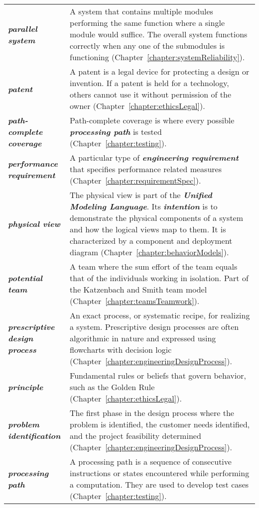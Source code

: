 \begin{longtable} { p{4cm} p{11cm}}
\emph{\textbf{parallel system}} & A system that contains multiple
modules performing the same function where a single module would
suffice. The overall system functions correctly when any one of the
submodules is functioning (Chapter~\ref{chapter:systemReliability}). \\
\emph{\textbf{patent}} & A patent is a legal device for protecting a
design or invention. If a patent is held for a technology, others cannot
use it without permission of the owner (Chapter~\ref{chapter:ethicsLegal}). \\
\emph{\textbf{path-complete coverage}} & Path-complete coverage is where
every possible \emph{\textbf{processing path}} is tested (Chapter~\ref{chapter:testing}). \\
\emph{\textbf{performance requirement}} & A particular type of
\emph{\textbf{engineering requirement}} that specifies performance
related measures (Chapter~\ref{chapter:requirementSpec}). \\
\emph{\textbf{physical view}} & The physical view is part of the
\emph{\textbf{Unified Modeling Language}}. Its \emph{\textbf{intention}}
is to demonstrate the physical components of a system and how the
logical views map to them. It is characterized by a component and
deployment diagram (Chapter~\ref{chapter:behaviorModels}). \\
\emph{\textbf{potential team}} & A team where the sum effort of the team
equals that of the individuals working in isolation. Part of the
Katzenbach and Smith team model (Chapter~\ref{chapter:teamsTeamwork}). \\
\emph{\textbf{prescriptive design process}} & An exact process, or
systematic recipe, for realizing a system. Prescriptive design processes
are often algorithmic in nature and expressed using flowcharts with
decision logic (Chapter~\ref{chapter:engineeringDesignProcess}). \\
\emph{\textbf{principle}} & Fundamental rules or beliefs that govern
behavior, such as the Golden Rule (Chapter~\ref{chapter:ethicsLegal}). \\
\emph{\textbf{problem identification}} & The first phase in the design
process where the problem is identified, the customer needs identified,
and the project feasibility determined (Chapter~\ref{chapter:engineeringDesignProcess}). \\
\emph{\textbf{processing path}} & A processing path is a sequence of
consecutive instructions or states encountered while performing a
computation. They are used to develop test cases (Chapter~\ref{chapter:testing}). \\

\end{longtable}

